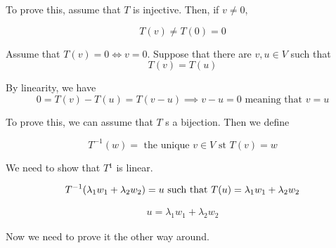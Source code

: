 To prove this, assume that $T$ is injective. Then, if $v \not = 0$,

$$
    T(v) \not = T(0) = 0
$$

Assume that $T(v) = 0 \Leftrightarrow v = 0$. Suppose that there are $v, u \in V$ such that
$$
    T(v) = T(u)
$$

By linearity, we have
$$
    0 = T(v) - T(u) =  T(v - u) \implies v - u = 0 \text{ meaning that } v = u
$$


To prove this, we can assume that $T$ s a bijection. Then we define

$$
    T^{-1} (w) = \text{ the unique $v \in V$ st $T(v) = w$}
$$

We need to show that $T{^1}$ is linear.

$$
    T^{-1}(\lambda_1 w_1 + \lambda_2 w_2) = u \text{ such that } T(u) = \lambda_1 w_1 + \lambda_2 w_2 \\
$$

\begin{align*}
    u =  \lambda_1 w_1 + \lambda_2 w_2
\end{align*}




Now we need to prove it the other way around.